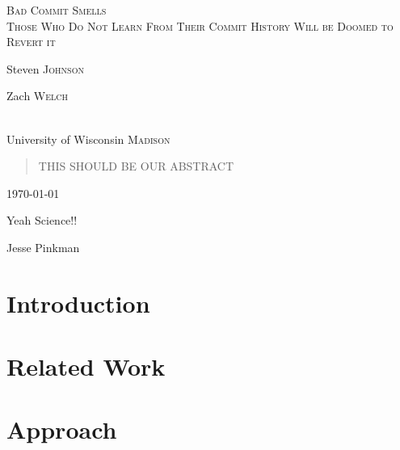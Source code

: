 \documentclass[letterpaper,12pt]{article}
\begin{document}


\begin{titlepage}
\begin{center}


\textsc{\huge Bad Commit Smells}\\[0.5cm]
\textsc{ Those Who Do Not Learn From Their Commit History Will be Doomed to Revert it}\\[1.0cm]


\begin{minipage}{0.4\textwidth}
\begin{flushleft} \large
Steven \textsc{Johnson}
\end{flushleft}
\end{minipage}
\begin{minipage}{0.4\textwidth}
\begin{flushright} \large
Zach \textsc{Welch}
\end{flushright}
\end{minipage}\\[1.5cm]

\large University of Wisconsin \textsc{Madison}\\[1.5cm]

\begin{abstract}
THIS SHOULD BE OUR ABSTRACT
\end{abstract}


\vfill

{\large \today}

\end{center}
\end{titlepage}

\tableofcontents
\listoffigures
\listoftables
\epigraph{Yeah Science!!}{ \textup{Jesse Pinkman}}

\section{Introduction}
\section{Related Work}
\section{Approach}






\end{document}

